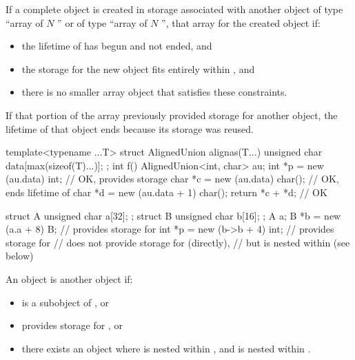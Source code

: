 \pnum
{}%
If a complete object is created
in storage associated with another object 
of type ``array of $N$ '' or
of type ``array of $N$ '',
that array 
for the created object if:
\begin{itemize}
\item
the lifetime of  has begun and not ended, and
\item
the storage for the new object fits entirely within , and
\item
there is no smaller array object that satisfies these constraints.
\end{itemize}
\begin{note}
If that portion of the array
previously provided storage for another object,
the lifetime of that object ends
because its storage was reused.
\end{note}
\begin{example}
\begin{codeblock}
template<typename ...T>
struct AlignedUnion {
  alignas(T...) unsigned char data[max(sizeof(T)...)];
};
int f() {
  AlignedUnion<int, char> au;
  int *p = new (au.data) int;           // OK,  provides storage
  char *c = new (au.data) char();       // OK, ends lifetime of 
  char *d = new (au.data + 1) char();
  return *c + *d; // OK
}

struct A { unsigned char a[32]; };
struct B { unsigned char b[16]; };
A a;
B *b = new (a.a + 8) B;                 //  provides storage for 
int *p = new (b->b + 4) int;            //  provides storage for 
                                        //  does not provide storage for  (directly),
                                        // but  is nested within  (see below)
\end{codeblock}
\end{example}

\pnum
{}%
An object  is  another object  if:
\begin{itemize}
\item
{} is a subobject of , or
\item
{} provides storage for , or
\item
there exists an object 
where  is nested within ,
and  is nested within .
\end{itemize}

